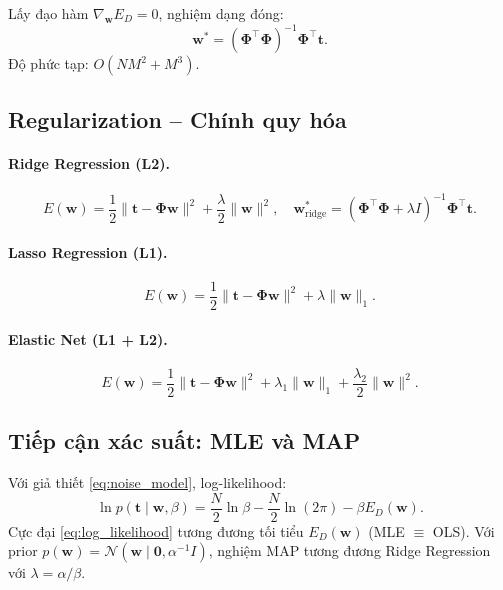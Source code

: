 \documentclass[12pt,a4paper]{article}
\begin{document}
Lấy đạo hàm $\nabla_{\mathbf{w}} E_D = 0$, nghiệm dạng đóng:
\begin{equation}
  \mathbf{w}^* = (\boldsymbol{\Phi}^\top \boldsymbol{\Phi})^{-1} \boldsymbol{\Phi}^\top \mathbf{t}.
  \label{eq:normal_eq}
\end{equation}
Độ phức tạp: $O(NM^2 + M^3)$.

\subsection{Regularization -- Chính quy hóa}

\paragraph{Ridge Regression (L2).}
\begin{equation}
  E(\mathbf{w}) = \frac{1}{2}\|\mathbf{t} - \boldsymbol{\Phi}\mathbf{w}\|^2
                + \frac{\lambda}{2}\|\mathbf{w}\|^2,
  \quad
  \mathbf{w}^*_{\text{ridge}} = (\boldsymbol{\Phi}^\top\boldsymbol{\Phi} + \lambda I)^{-1}
                                  \boldsymbol{\Phi}^\top\mathbf{t}.
  \label{eq:ridge}
\end{equation}

\paragraph{Lasso Regression (L1).}
\begin{equation}
  E(\mathbf{w}) = \frac{1}{2}\|\mathbf{t} - \boldsymbol{\Phi}\mathbf{w}\|^2
                + \lambda\|\mathbf{w}\|_1.
  \label{eq:lasso}
\end{equation}

\paragraph{Elastic Net (L1 + L2).}
\begin{equation}
  E(\mathbf{w}) = \frac{1}{2}\|\mathbf{t} - \boldsymbol{\Phi}\mathbf{w}\|^2
                + \lambda_1\|\mathbf{w}\|_1
                + \frac{\lambda_2}{2}\|\mathbf{w}\|^2.
  \label{eq:elasticnet}
\end{equation}

\subsection{Tiếp cận xác suất: MLE và MAP}

Với giả thiết \eqref{eq:noise_model}, log-likelihood:
\begin{equation}
  \ln p(\mathbf{t} \mid \mathbf{w}, \beta)
  = \frac{N}{2}\ln\beta - \frac{N}{2}\ln(2\pi) - \beta E_D(\mathbf{w}).
  \label{eq:log_likelihood}
\end{equation}
Cực đại \eqref{eq:log_likelihood} tương đương tối tiểu $E_D(\mathbf{w})$
(MLE $\equiv$ OLS). Với prior $p(\mathbf{w}) = \mathcal{N}(\mathbf{w} \mid \mathbf{0}, \alpha^{-1}I)$,
nghiệm MAP tương đương Ridge Regression với $\lambda = \alpha/\beta$.
\end{document}
